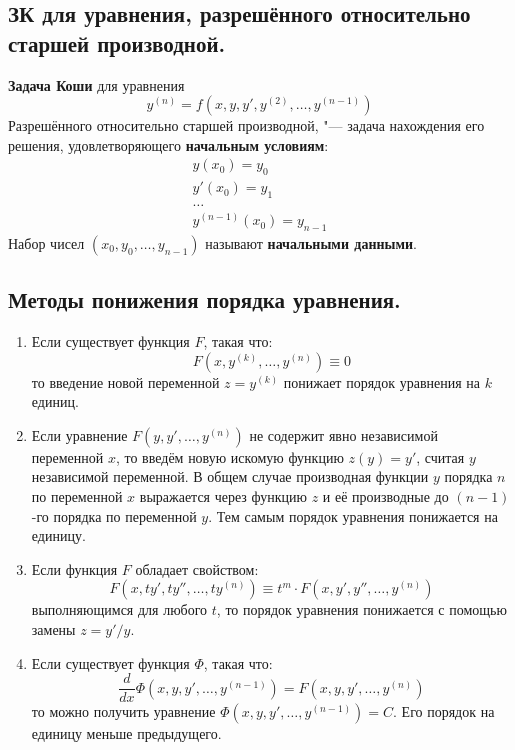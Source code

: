 \documentclass{article}
\begin{document}
\subsection{ЗК для уравнения, разрешённого относительно старшей производной.}
\textbf{Задача Коши} для уравнения
\begin{equation*}
    y^{(n)} = f(x, y, y', y^{(2)}, \ldots, y^{(n-1)})
\end{equation*}
Разрешённого относительно старшей производной, "--- задача нахождения его решения, удовлетворяющего \textbf{начальным условиям}:
\begin{gather*}
    y(x_0) = y_0\\
    y'(x_0) = y_1\\
    \ldots\\
    y^{(n - 1)}(x_0) = y_{n-1}
\end{gather*}
Набор чисел $(x_0, y_0, \ldots, y_{n-1})$ называют \textbf{начальными данными}.

\subsection{Методы понижения порядка уравнения.}
\begin{enumerate}
    \item Если существует функция $F$, такая что: 
    \begin{equation*}
        F(x, y^{(k)}, \ldots, y^{(n)}) \equiv 0
    \end{equation*}
    то введение новой переменной $z = y^{(k)}$ понижает порядок уравнения на $k$ единиц.
    \item Если уравнение $F(y, y', \ldots, y^{(n)})$ не содержит явно независимой переменной $x$, то введём новую искомую функцию $z(y) = y'$, считая $y$ независимой переменной. В общем случае производная функции $y$ порядка $n$ по переменной $x$ выражается через функцию $z$ и её производные до $(n - 1)$-го порядка по переменной $y$. Тем самым порядок уравнения понижается на единицу.
    \item Если функция $F$ обладает свойством:
    \begin{equation*}
        F(x, ty', ty'', \ldots, ty^{(n)}) \equiv t^m\cdot F(x, y', y'', \ldots, y^{(n)})
    \end{equation*}
    выполняющимся для любого $t$, то порядок уравнения понижается с помощью замены $z =y'/ y$.
    \item Если существует функция $\varPhi$, такая что:
    \begin{equation*}
        \frac{d}{dx} \varPhi(x, y, y', \ldots, y^{(n-1)}) = F(x, y, y', \ldots, y^{(n)})
    \end{equation*}
    то можно получить уравнение $\varPhi(x, y, y', \ldots, y^{(n-1)}) = C$. Его порядок на единицу меньше предыдущего.
\end{enumerate}
\end{document}

